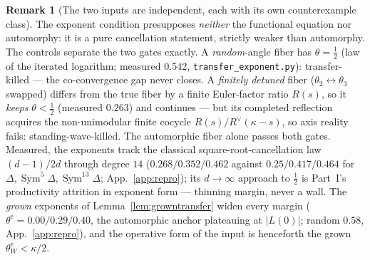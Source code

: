 \documentclass[11pt]{article}
\theoremstyle{definition}
\newtheorem{remark}[theorem]{Remark}
\newcommand{\Sym}{\operatorname{Sym}}
\begin{document}
\begin{remark}[The two inputs are independent, each with its own counterexample class]\label{rem:twogates}
The exponent condition presupposes \emph{neither} the functional equation nor automorphy: it is a pure
cancellation statement, strictly weaker than automorphy. The controls separate the two gates exactly. A
\emph{random}-angle fiber has $\theta=\tfrac12$ (law of the iterated logarithm; measured $0.542$,
\texttt{transfer\_exponent.py}): transfer-killed --- the co-convergence gap never closes. A \emph{finitely
detuned} fiber ($\theta_2\leftrightarrow\theta_3$ swapped) differs from the true fiber by a finite
Euler-factor ratio $R(s)$, so it \emph{keeps} $\theta<\tfrac12$ (measured $0.263$) and continues --- but its
completed reflection acquires the non-unimodular finite cocycle $R(s)/R^\vee(\kappa-s)$, so axis reality
fails: standing-wave-killed. The automorphic fiber alone passes both gates. Measured, the exponents track the
classical square-root-cancellation law $(d-1)/2d$ through degree $14$ ($0.268/0.352/0.462$ against
$0.25/0.417/0.464$ for $\Delta,\Sym^5\Delta,\Sym^{13}\Delta$; App.~\ref{app:repro}); its
$d\to\infty$ approach to $\tfrac12$ is Part~I's productivity attrition in exponent form --- thinning margin,
never a wall. The \emph{grown} exponents of Lemma~\ref{lem:growntransfer} widen every margin
($\theta^{\mathrm e}=0.00/0.29/0.40$, the automorphic anchor plateauing at $|L(0)|$; random $0.58$,
App.~\ref{app:repro}), and the operative form of the input is henceforth the grown
$\theta^{\mathrm e}_W<\kappa/2$.
\end{remark}
\end{document}
